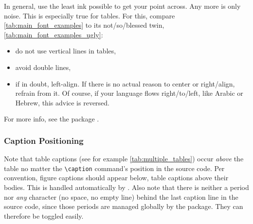 In general, use the least ink possible to get your point across.
Any more is only noise.
This is especially true for tables.
For this, compare \cref{tab:main_font_examples} to its not\-/so\-/blessed
twin, \cref{tab:main_font_examples_ugly}:
\begin{itemize}
    \item do not use vertical lines in tables,
    \item avoid double lines,
    \item if in doubt, left-align.
        If there is no actual reason to center or right\-/align, refrain from it.
        Of course, if your language flows right\-/to\-/left, like Arabic or Hebrew,
        this advice is reversed.
\end{itemize}
For more info, see the package .

\begin{table}
\end{table}

\subsubsection{Caption Positioning}

Note that table captions (see for example \cref{tab:multiple_tables}) occur
\emph{above} the table no matter the \verb|\caption| command's position in
the source code.
Per convention, figure captions should appear below, table captions above their bodies.
This is handled automatically by .
Also note that there is neither a period nor \emph{any} character
(no space, no empty line) behind the last caption line in the source code,
since those periods are managed globally by the  package.
They can therefore be toggled easily.

